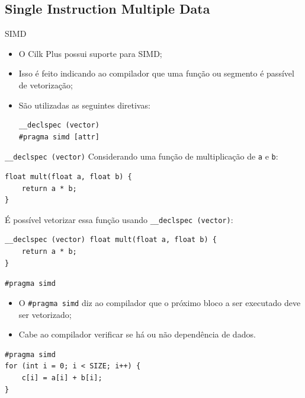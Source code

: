 \documentclass{beamer}
\begin{document}
\subsection{Single Instruction Multiple Data}
\begin{frame}[fragile]{SIMD}
\begin{itemize}
     \item O Cilk Plus possui suporte para SIMD;
     \item Isso é feito indicando ao compilador que uma função ou segmento é
     passível de vetorização;
     \item São utilizadas as seguintes diretivas:

\begin{lstlisting}[deletekeywords={vector}]
__declspec (vector)
#pragma simd [attr]
\end{lstlisting}
\end{itemize}
\end{frame}


\begin{frame}[fragile]{\texttt{\_\_declspec (vector)}}
Considerando uma função de multiplicação de \texttt{a} e \texttt{b}:
\begin{block}{}
\begin{lstlisting}
float mult(float a, float b) {
    return a * b;
}
\end{lstlisting}
\end{block}

É possível vetorizar essa função usando \texttt{\_\_declspec (vector)}:
\begin{block}{}
\begin{lstlisting}[deletekeywords={vector}]
__declspec (vector) float mult(float a, float b) {
    return a * b;
}
\end{lstlisting}
\end{block}
\end{frame}

\begin{frame}[fragile]{\texttt{\#pragma simd}}
\begin{itemize}
    \item O \texttt{\#pragma simd} diz ao compilador que o próximo bloco a ser
    executado deve ser vetorizado;
	\item Cabe ao compilador verificar se há ou não dependência de dados.
\end{itemize}
\begin{block}{}
\begin{lstlisting}
#pragma simd
for (int i = 0; i < SIZE; i++) { 
    c[i] = a[i] + b[i]; 
}
\end{lstlisting}
\end{block}
\end{frame}
\end{document}
